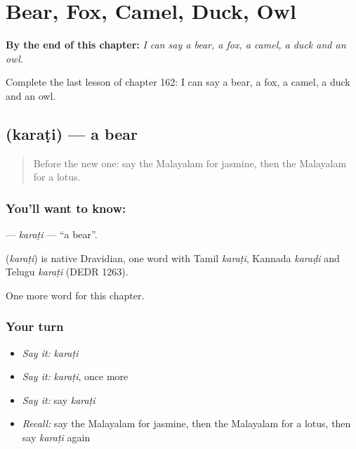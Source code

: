 
\chapter{Bear, Fox, Camel, Duck, Owl}
\label{ch:ml-bear-fox-camel-duck-owl}

\begin{chapteropening}
\textbf{By the end of this chapter:} \emph{I can say a bear, a fox, a camel, a duck and an owl.}

Complete the last lesson of chapter 162: I can say a bear, a fox, a camel, a duck and an owl.
\end{chapteropening}

\section[\texorpdfstring{\ml{കരടി} (karaṭi)}{കരടി (karaṭi)}]{ (karaṭi) — a bear}

\label{lesson:ML-C162-karati}



\begin{quote}
Before the new one: say the Malayalam for jasmine, then the Malayalam for a lotus.
\end{quote}

\subsection*{You'll want to know: }
\textbf{} — \emph{karaṭi} — \textquotedblleft{}a bear\textquotedblright{}.

\begin{cousinweb}
\textbf{} (\emph{karaṭi}) is native Dravidian, one word with Tamil \emph{karaṭi}, Kannada \emph{karaḍi} and Telugu \emph{karaṭi} (DEDR 1263).
\end{cousinweb}

\begin{grammarlens}[title={What you've built}]
One more word for this chapter.
\end{grammarlens}

\subsection*{Your turn}
\begin{itemize}
\raggedright
  \item \emph{Say it:} \emph{karaṭi}
  \item \emph{Say it:} \emph{karaṭi}, once more
  \item \emph{Say it:} say \emph{karaṭi}
  \item \emph{Recall:} say the Malayalam for jasmine, then the Malayalam for a lotus, then say \emph{karaṭi} again
\end{itemize}


